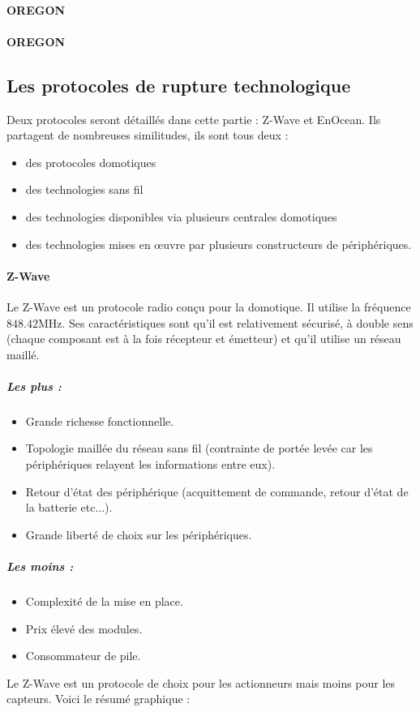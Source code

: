 \documentclass[a4paper,10pt]{article}
\begin{document}
\paragraph{OREGON}
\paragraph{OREGON}


\subsection{Les protocoles de rupture technologique}
Deux protocoles seront détaillés dans cette partie : Z-Wave et EnOcean. Ils partagent de nombreuses similitudes, ils sont tous deux :
\begin{itemize}
\item des protocoles domotiques
\item des technologies sans fil
\item des technologies disponibles via plusieurs centrales domotiques
\item des technologies mises en œuvre par plusieurs constructeurs de périphériques.

\end{itemize}
\paragraph{Z-Wave}
Le Z-Wave est un protocole radio conçu pour la domotique. Il utilise la fréquence $848.42$MHz.
Ses caractéristiques sont qu'il est relativement sécurisé, à double sens (chaque composant est à la fois récepteur et émetteur) et qu'il utilise un réseau maillé.
\subparagraph{Les plus :}
\begin{itemize}
\item Grande richesse fonctionnelle.
\item Topologie maillée du réseau sans fil (contrainte de portée levée car les périphériques relayent les informations entre eux).
\item Retour d'état des périphérique (acquittement de commande, retour d'état de la batterie etc...).
\item Grande liberté de choix sur les périphériques.
\end{itemize}
\subparagraph{Les moins :}
\begin{itemize}
\item Complexité de la mise en place.
\item Prix élevé des modules.
\item Consommateur de pile.\newline
\end{itemize}
Le Z-Wave est un protocole de choix pour les actionneurs mais moins pour les capteurs. Voici le résumé graphique :
\end{document}
